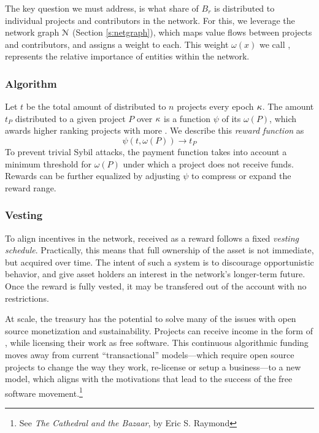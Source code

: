 The key question we must address, is what share of $B_r$ is distributed to
individual projects and contributors in the network.
For this, we leverage the \oscoin{} network graph $\mathcal{N}$ (Section
\ref{s:netgraph}), which maps value flows between projects and contributors,
and assigns a weight to each. This weight $\omega(x)$ we call \osrank{}, represents
the relative importance of entities within the network.

\subsubsection{Algorithm} Let $t$ be the total amount of \oscoin{} distributed
to $n$ projects every epoch $\kappa$. The amount $t_P$ distributed to a given
project $P$ over $\kappa$ is a function $\psi$ of its \osrank{} $\omega(P)$,
which awards higher ranking projects with more \oscoin{}. We describe this
\emph{reward function} as
\[
    \psi(t, \omega(P)) \to t_P
\]
To prevent trivial Sybil attacks, the payment function takes
into account a minimum threshold for $\omega(P)$ under which a project does not
receive funds. Rewards can be further equalized by adjusting $\psi$ to
compress or expand the reward range.

\subsubsection{Vesting} To align incentives in the network, \oscoin{} received
as a reward follows a fixed \emph{vesting schedule}. Practically, this means
that full ownership of the asset is not immediate, but acquired over time. The
intent of such a system is to discourage opportunistic behavior, and give asset
holders an interest in the network's longer-term future. Once the reward is
fully vested, it may be transfered out of the account with no restrictions.

\bigskip

\noindent At scale, the \oscoin{} treasury has the potential to solve many of
the issues with open source monetization and sustainability. Projects can
receive income in the form of \oscoin{}, while licensing their work as free
software. This continuous algorithmic funding moves
away from current ``transactional'' models---which require open source projects
to change the way they work, re-license or setup a business---to a new model,
which aligns with the motivations that lead to the success of the free software
movement.\footnote{See \emph{The Cathedral and the Bazaar}, by Eric S. Raymond}

